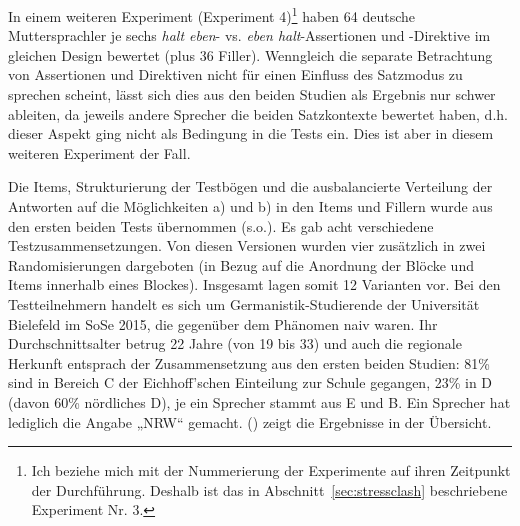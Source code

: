 In einem weiteren Experiment (Experiment 4)\footnote{Ich beziehe mich mit der Nummerierung der Experimente auf ihren Zeitpunkt der Durchführung. Deshalb ist das in Abschnitt~\ref{sec:stressclash} beschriebene Experiment Nr. 3.} haben 64 deutsche Muttersprachler je sechs \textit{halt eben}- vs. \textit{eben halt}-Assertionen und -Direktive im glei\-chen Design bewertet (plus 36 Filler). Wenngleich die separate Betrachtung von Assertionen und Direktiven nicht für einen Einfluss des Satzmodus zu sprechen scheint, lässt sich dies aus den beiden Studien als Ergebnis nur schwer ableiten, da jeweils andere Sprecher die beiden Satzkontexte bewertet haben, d.h. dieser Aspekt ging nicht als Bedingung in die Tests ein. Dies ist aber in diesem weiteren Experiment der Fall.

Die Items, Strukturierung der Testbögen und die ausbalancierte Verteilung der Antworten auf die Möglichkeiten a) und b) in den Items und Fillern wurde aus den ersten beiden Tests übernommen (s.o.). Es gab acht verschiedene Testzusammensetzungen. Von
diesen Versionen wurden vier zusätzlich in zwei Randomisie\-rungen dargeboten (in Bezug
auf die Anordnung der Blöcke und Items innerhalb eines Blockes). Insgesamt lagen somit
12 Varianten vor. Bei den Testteilnehmern handelt es sich um Germanistik-Studierende der Universität Bielefeld im SoSe 2015, die gegenüber dem Phänomen naiv waren. Ihr Durchschnittsalter betrug 22 Jahre (von 19 bis 33) und auch die regionale Herkunft entsprach der Zusammensetzung aus den ersten beiden Studien: 81\% sind in Bereich C der Eichhoff'schen Einteilung zur Schule gegangen, 23\% in D (davon 60\% nördliches D), je ein Sprecher stammt aus E und B. Ein Sprecher hat lediglich die Angabe „NRW“ gemacht. () zeigt die Ergebnisse in der Übersicht.


